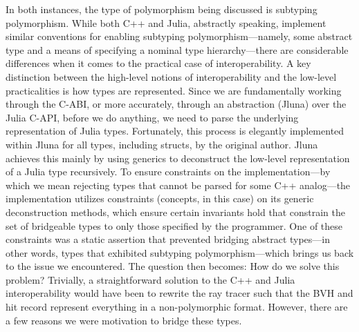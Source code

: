 In both instances, the type of polymorphism being discussed is subtyping polymorphism. While both C++ and Julia, abstractly speaking, implement similar conventions for enabling subtyping polymorphism—namely, some abstract type and a means of specifying a nominal type hierarchy—there are considerable differences when it comes to the practical case of interoperability. A key distinction between the high-level notions of interoperability and the low-level practicalities is how types are represented. Since we are fundamentally working through the C-ABI, or more accurately, through an abstraction (Jluna) over the Julia C-API, before we do anything, we need to parse the underlying representation of Julia types. Fortunately, this process is elegantly implemented within Jluna for all types, including structs, by the original author. Jluna achieves this mainly by using generics to deconstruct the low-level representation of a Julia type recursively. To ensure constraints on the implementation—by which we mean rejecting types that cannot be parsed for some C++ analog—the implementation utilizes constraints (concepts, in this case) on its generic deconstruction methods, which ensure certain invariants hold that constrain the set of bridgeable types to only those specified by the programmer. One of these constraints was a static assertion that prevented bridging abstract types—in other words, types that exhibited subtyping polymorphism—which brings us back to the issue we encountered. The question then becomes: How do we solve this problem? Trivially, a straightforward solution to the C++ and Julia interoperability would have been to rewrite the ray tracer such that the BVH and hit record represent everything in a non-polymorphic format. However, there are a few reasons we were motivation to bridge these types.

